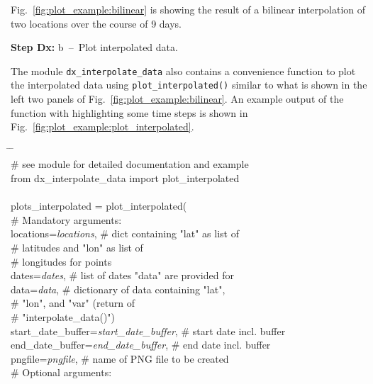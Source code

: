 \documentclass[10pt,a4paper,titlepage,parskip]{scrartcl}
\newenvironment{ttfont}{\fontfamily{\ttdefault}\selectfont}{\par}
\newcommand{\GRAU}[1]{\textcolor{ufzgray2}{#1}}
\begin{document}
Fig.~\ref{fig:plot_example:bilinear} is showing the result of a bilinear interpolation of two locations over the course of 9 days.
\pagebreak 

\textbf{Step Dx:} b~--~Plot interpolated data.

The module \texttt{dx\_interpolate\_data} also contains a convenience function to plot the interpolated data using \texttt{plot\_interpolated()} similar to what is shown in the left two panels of Fig.~\ref{fig:plot_example:bilinear}. An example output of the function with highlighting some time steps is shown in Fig.~\ref{fig:plot_example:plot_interpolated}.

\begin{framed}
	\vspace*{-1.2cm}
	\begin{ttfont}
		\begin{tabbing}
			\hspace{1.0cm} \= \hspace{7.2cm} \= \kill \\[4pt]
			\GRAU{\# see module for detailed documentation and example}\\
			from dx\_interpolate\_data import plot\_interpolated\\
			\\
			plots\_interpolated = plot\_interpolated(\\
			\> \GRAU{\# Mandatory arguments:}\\
			\> locations=\textit{locations}, \> \GRAU{\# dict containing "lat" as list of }\\
			\> \> \GRAU{\# latitudes and "lon" as list of }\\
			\> \> \GRAU{\# longitudes for points }\\
			\> dates=\textit{dates}, \> \GRAU{\# list of dates "data" are provided for}\\
			\> data=\textit{data}, \> \GRAU{\# dictionary of data containing "lat", }\\
			\> \> \GRAU{\# "lon", and "var" (return of }\\
			\> \> \GRAU{\# "interpolate\_data()")}\\
			\> start\_date\_buffer=\textit{start\_date\_buffer}, \> \GRAU{\# start date incl. buffer}\\
			\> end\_date\_buffer=\textit{end\_date\_buffer}, \> \GRAU{\# end date incl. buffer}\\
			\> pngfile=\textit{pngfile}, \> \GRAU{\# name of PNG file to be created}\\
			\> \GRAU{\# Optional arguments:}\\

\end{tabbing}
\end{ttfont}
\end{framed}
\end{document}

